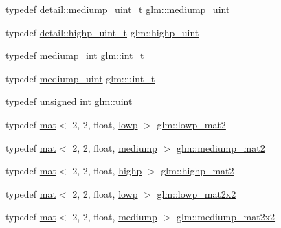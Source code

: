 \begin{DoxyCompactItemize}
\item 
typedef \hyperlink{namespaceglm_1_1detail_a98f572e92099cc1b5740f1ccf1c80f8d}{detail\+::mediump\+\_\+uint\+\_\+t} \hyperlink{group__core__precision_ga08ae38ad78ade3539fdd1d25052b8c51}{glm\+::mediump\+\_\+uint}
\item 
typedef \hyperlink{namespaceglm_1_1detail_a994c05c8a976cc902a7cd193ad36bbba}{detail\+::highp\+\_\+uint\+\_\+t} \hyperlink{group__core__precision_gabfd1cf11193324a5f77d3831b6ac3205}{glm\+::highp\+\_\+uint}
\item 
typedef \hyperlink{group__core__precision_ga2a3dcbcd7f4e17663d393a12061ac6ac}{mediump\+\_\+int} \hyperlink{group__core__precision_gacd01d170508f812968875b0f2e730e8c}{glm\+::int\+\_\+t}
\item 
typedef \hyperlink{group__core__precision_ga08ae38ad78ade3539fdd1d25052b8c51}{mediump\+\_\+uint} \hyperlink{group__core__precision_ga5f2ae871c284c9d39ae8fdbb1305b566}{glm\+::uint\+\_\+t}
\item 
typedef unsigned int \hyperlink{group__core__precision_ga4fd29415871152bfb5abd588334147c8}{glm\+::uint}
\item 
typedef \hyperlink{structglm_1_1mat}{mat}$<$ 2, 2, float, \hyperlink{namespaceglm_a36ed105b07c7746804d7fdc7cc90ff25ae161af3fc695e696ce3bf69f7332bc2d}{lowp} $>$ \hyperlink{group__core__precision_ga786e43e2a310fa4bddba3e41b786aa82}{glm\+::lowp\+\_\+mat2}
\item 
typedef \hyperlink{structglm_1_1mat}{mat}$<$ 2, 2, float, \hyperlink{namespaceglm_a36ed105b07c7746804d7fdc7cc90ff25a6416f3ea0c9025fb21ed50c4d6620482}{mediump} $>$ \hyperlink{group__core__precision_ga698131fdb127cb55e8b70cc1b2c4ff67}{glm\+::mediump\+\_\+mat2}
\item 
typedef \hyperlink{structglm_1_1mat}{mat}$<$ 2, 2, float, \hyperlink{namespaceglm_a36ed105b07c7746804d7fdc7cc90ff25ac6f7eab42eacbb10d59a58e95e362074}{highp} $>$ \hyperlink{group__core__precision_gae7066dac53a008363d6faeabf46ccb03}{glm\+::highp\+\_\+mat2}
\item 
typedef \hyperlink{structglm_1_1mat}{mat}$<$ 2, 2, float, \hyperlink{namespaceglm_a36ed105b07c7746804d7fdc7cc90ff25ae161af3fc695e696ce3bf69f7332bc2d}{lowp} $>$ \hyperlink{group__core__precision_gaab9064a0fd0e3ac8d4ae8ceb2dc4fe56}{glm\+::lowp\+\_\+mat2x2}
\item 
typedef \hyperlink{structglm_1_1mat}{mat}$<$ 2, 2, float, \hyperlink{namespaceglm_a36ed105b07c7746804d7fdc7cc90ff25a6416f3ea0c9025fb21ed50c4d6620482}{mediump} $>$ \hyperlink{group__core__precision_gaa7581ec892b01e6ba19c4fdbc7c60df4}{glm\+::mediump\+\_\+mat2x2}

\end{DoxyCompactItemize}

